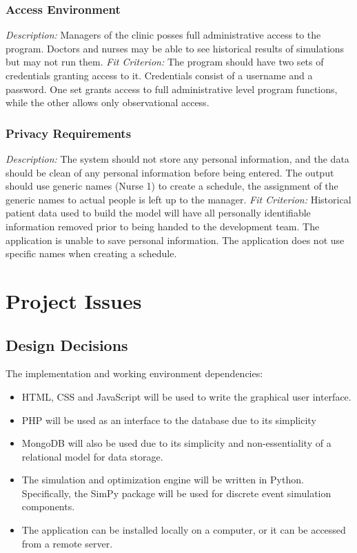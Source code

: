 \documentclass[12pt, titlepage]{article}
\begin{document}
\subsubsection{Access Environment}
\textit{Description:}\newline
Managers of the clinic posses full administrative access to the program. Doctors and nurses may be able to see historical results of simulations but may not run them.
\newline \newline 
\textit{Fit Criterion:}\newline 
The program should have two sets of credentials granting access to it. Credentials consist of a username and a password. One set grants access to full administrative level program functions, while the other allows only observational access. 

\subsubsection{Privacy Requirements}
\textit{Description:}\newline
The system should not store any personal information, and the data should be clean of any personal information before being entered. The output should use generic names (Nurse 1) to create a schedule, the assignment of the generic names to actual people is left up to the manager.
\newline \newline 
\textit{Fit Criterion:}\newline 
Historical patient data used to build the model will have all personally identifiable information removed prior to being handed to the development team. The application is unable to save personal information. The application does not use specific names when creating a schedule.

\section{Project Issues}
\subsection{Design Decisions}
The implementation and working environment dependencies:
\begin{itemize}
  \item HTML, CSS and JavaScript will be used to write the graphical user interface.
  \item PHP will be used as an interface to the database due to its simplicity
  \item MongoDB will also be used due to its simplicity and non-essentiality of a relational model for data storage. 
  \item The simulation and optimization engine will be written in Python. Specifically, the SimPy package will be used for discrete event simulation components.
  \item The application can be installed locally on a computer, or it can be  
  	accessed from a remote server.
\end{itemize}
\end{document}
